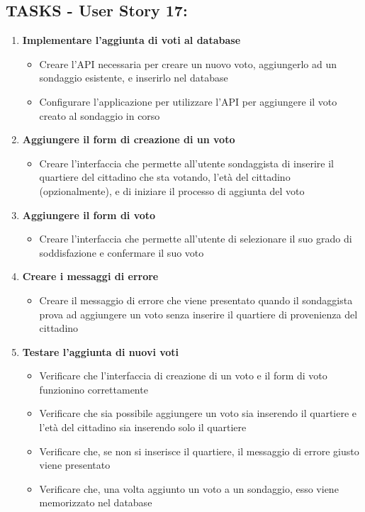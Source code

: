     \subsection*{TASKS - User Story 17:}  
    \begin{enumerate}  
        \item \textbf{Implementare l'aggiunta di voti al database}  
            \begin{itemize}  
                \item Creare l'API necessaria per creare un nuovo voto, aggiungerlo ad un sondaggio esistente, e inserirlo nel database
                \item Configurare l'applicazione per utilizzare l'API per aggiungere il voto creato al sondaggio in corso
            \end{itemize} 
        \item \textbf{Aggiungere il form di creazione di un voto}  
            \begin{itemize}  
                \item Creare l'interfaccia che permette all'utente sondaggista di inserire il quartiere del cittadino che sta votando, l'età del cittadino (opzionalmente), e di iniziare il processo di aggiunta del voto
            \end{itemize} 
        \item \textbf{Aggiungere il form di voto}  
            \begin{itemize}  
                \item Creare l'interfaccia che permette all'utente di selezionare il suo grado di soddisfazione e confermare il suo voto
            \end{itemize} 
        \item \textbf{Creare i messaggi di errore}  
            \begin{itemize}  
                \item Creare il messaggio di errore che viene presentato quando il sondaggista prova ad aggiungere un voto senza inserire il quartiere di provenienza del cittadino
            \end{itemize} 
        \item \textbf{Testare l'aggiunta di nuovi voti}  
            \begin{itemize}  
                \item Verificare che l'interfaccia di creazione di un voto e il form di voto funzionino correttamente
                \item Verificare che sia possibile aggiungere un voto sia inserendo il quartiere e l'età del cittadino sia inserendo solo il quartiere
                \item Verificare che, se non si inserisce il quartiere, il messaggio di errore giusto viene presentato
                \item Verificare che, una volta aggiunto un voto a un sondaggio, esso viene memorizzato nel database
            \end{itemize} 
    \end{enumerate}
